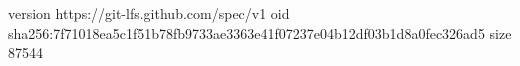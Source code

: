 version https://git-lfs.github.com/spec/v1
oid sha256:7f71018ea5c1f51b78fb9733ae3363e41f07237e04b12df03b1d8a0fec326ad5
size 87544
